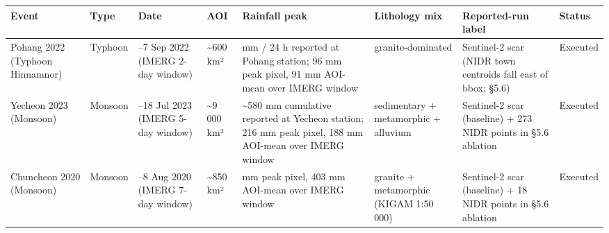 \documentclass[11pt,a4paper]{article}
\newcounter{none}
\begin{document}
{\def\LTcaptype{none} %
\begin{longtable}[]{@{}
  >{\raggedright\arraybackslash}p{}
  >{\raggedright\arraybackslash}p{}
  >{\raggedright\arraybackslash}p{}
  >{\raggedright\arraybackslash}p{}
  >{\raggedright\arraybackslash}p{}
  >{\raggedright\arraybackslash}p{}
  >{\raggedright\arraybackslash}p{}
  >{\raggedright\arraybackslash}p{}@{}}
\toprule\noalign{}
\begin{minipage}[b]{\linewidth}\raggedright
Event
\end{minipage} & \begin{minipage}[b]{\linewidth}\raggedright
Type
\end{minipage} & \begin{minipage}[b]{\linewidth}\raggedright
Date
\end{minipage} & \begin{minipage}[b]{\linewidth}\raggedright
AOI
\end{minipage} & \begin{minipage}[b]{\linewidth}\raggedright
Rainfall peak
\end{minipage} & \begin{minipage}[b]{\linewidth}\raggedright
Lithology mix
\end{minipage} & \begin{minipage}[b]{\linewidth}\raggedright
Reported-run label
\end{minipage} & \begin{minipage}[b]{\linewidth}\raggedright
Status
\end{minipage} \\
\midrule\noalign{}
\endhead
\bottomrule\noalign{}
\endlastfoot
Pohang 2022 (Typhoon Hinnamnor) & Typhoon & 5--7 Sep 2022 (IMERG 2-day window) & \textasciitilde600 km² & 412 mm / 24 h reported at Pohang station; 96 mm peak pixel, 91 mm AOI-mean over IMERG window & granite-dominated & Sentinel-2 scar (NIDR town centroids fall east of bbox; §5.6) & Executed \\
Yecheon 2023 (Monsoon) & Monsoon & 13--18 Jul 2023 (IMERG 5-day window) & \textasciitilde9 000 km² & \textasciitilde580 mm cumulative reported at Yecheon station; 216 mm peak pixel, 188 mm AOI-mean over IMERG window & sedimentary + metamorphic + alluvium & Sentinel-2 scar (baseline) + 273 NIDR points in §5.6 ablation & Executed \\
Chuncheon 2020 (Monsoon) & Monsoon & 1--8 Aug 2020 (IMERG 7-day window) & \textasciitilde850 km² & 461 mm peak pixel, 403 mm AOI-mean over IMERG window & granite + metamorphic (KIGAM 1:50 000) & Sentinel-2 scar (baseline) + 18 NIDR points in §5.6 ablation & Executed \\
\end{longtable}
}
\end{document}
